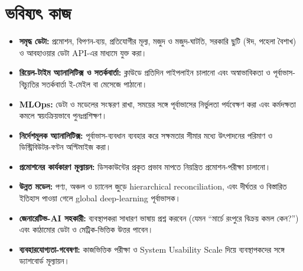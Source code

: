 \section{ভবিষ্যৎ কাজ}
\begin{itemize}
  \item \textbf{সমৃদ্ধ ডেটা:} প্রমোশন, বিপণন-ব্যয়, প্রতিযোগীর মূল্য, মজুদ ও মজুদ-ঘাটতি, সরকারি ছুটি (ঈদ, পহেলা বৈশাখ) ও আবহাওয়ার ডেটা
        API-এর মাধ্যমে যুক্ত করা।
  \item \textbf{রিয়েল-টাইম অ্যানালিটিক্স ও সতর্কবার্তা:} ক্লাউডে প্রতিদিন পাইপলাইন চালানো এবং অস্বাভাবিকতা ও পূর্বাভাস-বিচ্যুতির সতর্কবার্তা ই-মেইল
        বা মেসেজে পাঠানো।
  \item \textbf{MLOps:} ডেটা ও মডেলের সংস্করণ রাখা, সময়ের সঙ্গে পূর্বাভাসের নির্ভুলতা পর্যবেক্ষণ করা এবং কর্মদক্ষতা কমলে স্বয়ংক্রিয়ভাবে
        পুনঃপ্রশিক্ষণ।
  \item \textbf{নির্দেশমূলক অ্যানালিটিক্স:} পূর্বাভাস-ব্যবধান ব্যবহার করে সক্ষমতার সীমার মধ্যে উৎপাদনের পরিমাণ ও ডিস্ট্রিবিউটর-বণ্টন অপ্টিমাইজ করা।
  \item \textbf{প্রমোশনের কার্যকারণ মূল্যায়ন:} ডিসকাউন্টের প্রকৃত প্রভাব মাপতে নিয়ন্ত্রিত প্রমোশন-পরীক্ষা চালানো।
  \item \textbf{উন্নত মডেল:} পণ্য, অঞ্চল ও চ্যানেল জুড়ে hierarchical reconciliation, এবং দীর্ঘতর ও বিস্তারিত ইতিহাস পাওয়া গেলে global
        deep-learning পূর্বাভাসক।
  \item \textbf{জেনারেটিভ-AI সহকারী:} ব্যবস্থাপকরা সাধারণ ভাষায় প্রশ্ন করবেন (যেমন ``মার্চে রংপুরে বিক্রয় কমল কেন?'') এবং কাঠামোর ডেটা
        ও মেট্রিক-ভিত্তিক উত্তর পাবেন।
  \item \textbf{ব্যবহারযোগ্যতা-গবেষণা:} কাজভিত্তিক পরীক্ষা ও System Usability Scale দিয়ে ব্যবস্থাপকদের সঙ্গে ড্যাশবোর্ড মূল্যায়ন।
\end{itemize}
